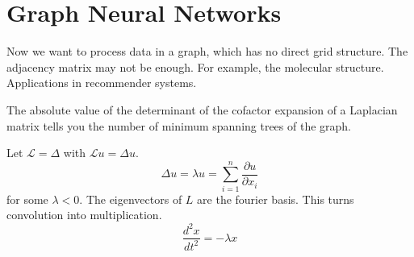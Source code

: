 \section{Graph Neural Networks} 

Now we want to process data in a graph, which has no direct grid structure. The adjacency matrix may not be enough. For example, the molecular structure. Applications in recommender systems. 

The absolute value of the determinant of the cofactor expansion of a Laplacian matrix tells you the number of minimum spanning trees of the graph. 

Let $\mathcal{L} = \Delta$ with $\mathcal{L} u = \Delta u$. 
\begin{equation}
  \Delta u = \lambda u = \sum_{i=1}^n \frac{\partial u}{\partial x_i}
\end{equation}
for some $\lambda < 0$. The eigenvectors of $L$ are the fourier basis. This turns convolution into multiplication. 
\begin{equation}
  \frac{d^2 x}{d t^2} = - \lambda x 
\end{equation}


